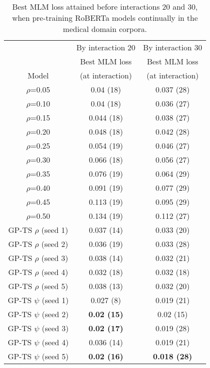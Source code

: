 \begin{table}[!h]
	\caption{Best MLM loss attained before interactions 20 and 30, when pre-training RoBERTa models continually in the medical domain corpora.}
	\label{tab:medical_MLM_medical_robertabase}
	\vspace*{-1ex}
	\centering
		\begin{tabular}{|c|c|c|}
			\hline
		\cellcolor[gray]{0.6} 
			& By interaction 20 \cellcolor[gray]{0.6} 
			& By interaction 30 \cellcolor[gray]{0.6} \\ \cline{1-3}
		\cellcolor[gray]{0.6} 
			& Best MLM loss\cellcolor[gray]{0.8} 
			& Best MLM loss \cellcolor[gray]{0.8} \\ \cline{1-3}
		\multirow{-3}{*}{Model}\cellcolor[gray]{0.6} 
			& (at interaction)\cellcolor[gray]{0.8} 
			& (at interaction)\cellcolor[gray]{0.8} \\ \hline
$\rho$=0.05 	 & 0.04 (18) 	 & 0.037 (28) 	\\ \hline 
$\rho$=0.10 	 & 0.04 (18) 	 & 0.036 (27) 	\\ \hline 
$\rho$=0.15 	 & 0.044 (18) 	 & 0.038 (27) 	\\ \hline 
$\rho$=0.20 	 & 0.048 (18) 	 & 0.042 (28) 	\\ \hline 
$\rho$=0.25 	 & 0.054 (19) 	 & 0.046 (27) 	\\ \hline 
$\rho$=0.30 	 & 0.066 (18) 	 & 0.056 (27) 	\\ \hline 
$\rho$=0.35 	 & 0.076 (19) 	 & 0.064 (29) 	\\ \hline 
$\rho$=0.40 	 & 0.091 (19) 	 & 0.077 (29) 	\\ \hline 
$\rho$=0.45 	 & 0.113 (19) 	 & 0.095 (29) 	\\ \hline 
$\rho$=0.50 	 & 0.134 (19) 	 & 0.112 (27) 	\\ \hline 
\rowcolor[gray]{0.95} 
GP-TS $\rho$ (seed 1) 	 & 0.037 (14) 	 & 0.033 (20) 	\\ \hline 
\rowcolor[gray]{0.95}
GP-TS $\rho$ (seed 2) 	 & 0.036 (19) 	 & 0.033 (28) 	\\ \hline 
\rowcolor[gray]{0.95}
GP-TS $\rho$ (seed 3) 	 & 0.038 (14) 	 & 0.032 (21) 	\\ \hline 
\rowcolor[gray]{0.95}
GP-TS $\rho$ (seed 4) 	 & 0.032 (18) 	 & 0.032 (18) 	\\ \hline 
\rowcolor[gray]{0.95}
GP-TS $\rho$ (seed 5) 	 & 0.038 (13) 	 & 0.032 (20) 	\\ \hline 
GP-TS $\psi$ (seed 1) 	 & 0.027 (8) 	 & 0.019 (21) 	\\ \hline 
GP-TS $\psi$ (seed 2)	 & \textbf{0.02 (15)} 	 & 0.02 (15) 	\\ \hline 
GP-TS $\psi$ (seed 3)	 & \textbf{0.02 (17)} 	 & 0.019 (28) 	\\ \hline 
GP-TS $\psi$ (seed 4)	 & 0.036 (14) 	 & 0.019 (21) 	\\ \hline 
GP-TS $\psi$ (seed 5)	 & \textbf{0.02 (16)} 	 & \textbf{0.018 (28)} 	\\ \hline 
		\end{tabular}
\vspace*{-1ex}
\end{table}